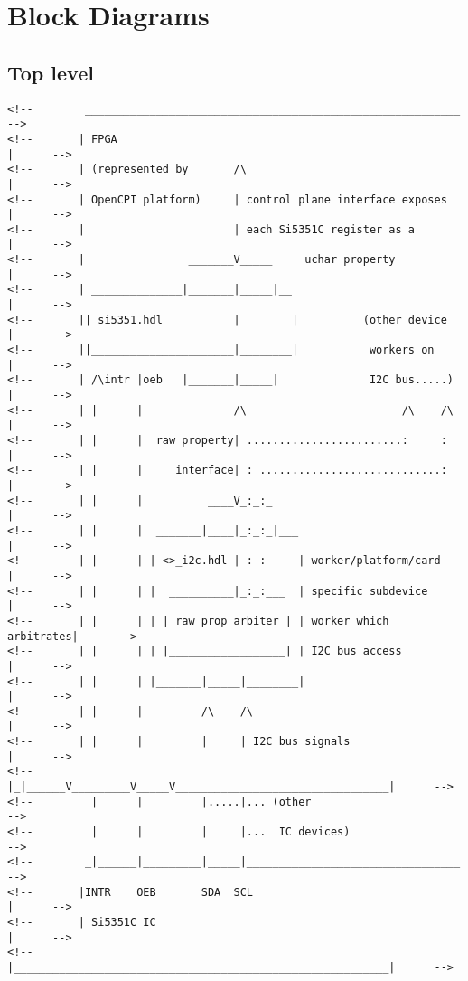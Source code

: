 \section*{Block Diagrams}
\subsection*{Top level}
\begin{center}
\small
\begin{verbatim}
<!--        __________________________________________________________       -->
<!--       | FPGA                                                     |      -->
<!--       | (represented by       /\                                 |      -->
<!--       | OpenCPI platform)     | control plane interface exposes  |      -->
<!--       |                       | each Si5351C register as a       |      -->
<!--       |                _______V_____     uchar property          |      -->
<!--       | ______________|_______|_____|__                          |      -->
<!--       || si5351.hdl           |        |          (other device  |      -->
<!--       ||______________________|________|           workers on    |      -->
<!--       | /\intr |oeb   |_______|_____|              I2C bus.....) |      -->
<!--       | |      |              /\                        /\    /\ |      -->
<!--       | |      |  raw property| ........................:     :  |      -->
<!--       | |      |     interface| : ............................:  |      -->
<!--       | |      |          ____V_:_:_                             |      -->
<!--       | |      |  _______|____|_:_:_|___                         |      -->
<!--       | |      | | <>_i2c.hdl | : :     | worker/platform/card-  |      -->
<!--       | |      | |  __________|_:_:___  | specific subdevice     |      -->
<!--       | |      | | | raw prop arbiter | | worker which arbitrates|      -->
<!--       | |      | | |__________________| | I2C bus access         |      -->
<!--       | |      | |_______|_____|________|                        |      -->
<!--       | |      |         /\    /\                                |      -->
<!--       | |      |         |     | I2C bus signals                 |      -->
<!--       |_|______V_________V_____V_________________________________|      -->
<!--         |      |         |.....|... (other                              -->
<!--         |      |         |     |...  IC devices)                        -->
<!--        _|______|_________|_____|_________________________________       -->
<!--       |INTR    OEB       SDA  SCL                                |      -->
<!--       | Si5351C IC                                               |      -->
<!--       |__________________________________________________________|      -->
\end{verbatim}
\normalsize
\end{center}\pagebreak

